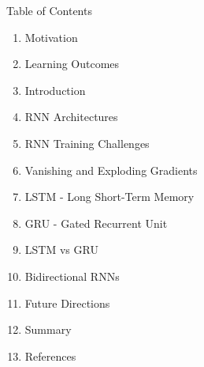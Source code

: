 \begin{frame}{Table of Contents}
    \small
    \begin{enumerate}\itemsep0.12em
        \item Motivation
        \item Learning Outcomes
        \item Introduction
        \item RNN Architectures
        \item RNN Training Challenges
        \item Vanishing and Exploding Gradients
        \item LSTM - Long Short-Term Memory
        \item GRU - Gated Recurrent Unit
        \item LSTM vs GRU
        \item Bidirectional RNNs
        \item Future Directions
        \item Summary
        \item References
    \end{enumerate}
\end{frame}